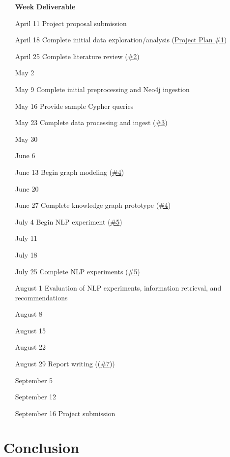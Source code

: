 \documentclass[11pt]{article}   	%
\begin{document}
\begin{itemize}
\item [\textbf{Week}] \textbf{Deliverable}
\item [April 11] Project proposal submission
\item [April 18] Complete initial data exploration/analysis (\hyperref[sec:PropDataExploration]{Project Plan \#1})
\item [April 25] Complete literature review (\hyperref[sec:PropLiteratureReview]{\#2})

\item [May 2]
\item [May 9] Complete initial preprocessing and Neo4j ingestion
\item [May 16] Provide sample Cypher queries
\item [May 23] Complete data processing and ingest (\hyperref[sec:PropDataProcessing]{\#3})
\item [May 30]

\item [June 6]
\item [June 13] Begin graph modeling (\hyperref[sec:PropGraphModeling]{\#4})
\item [June 20]
\item [June 27] Complete knowledge graph prototype (\hyperref[sec:PropGraphModeling]{\#4})

\item [July 4] Begin NLP experiment (\hyperref[sec:PropNLP]{\#5})
\item [July 11]
\item [July 18]
\item [July 25] Complete NLP experiments (\hyperref[sec:PropNLP]{\#5})

\item [August 1] Evaluation of NLP experiments, information retrieval, and recommendations
\item [August 8]
\item [August 15]
\item [August 22]
\item [August 29] Report writing ((\hyperref[sec:PropWrittenReport]{\#7}))

\item [September 5]
\item [September 12]
\item [September 16] Project submission
\end{itemize}

\newpage
\section{Conclusion}
\end{document}
